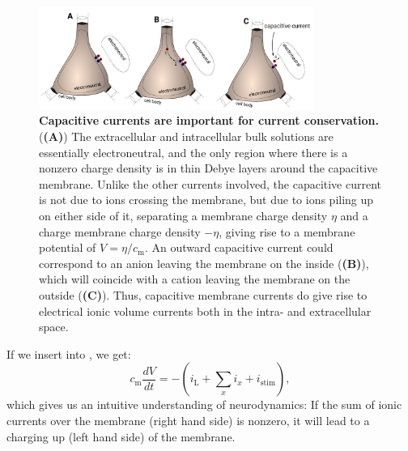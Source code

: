 \begin{figure}[!ht]
\begin{center}
\includegraphics[width=0.8\textwidth]{Figures/Neuron/capacitive_currents.pdf}
\end{center}
\caption{\textbf{Capacitive currents are important for current conservation.}  (\textbf{(A)}) The extracellular and intracellular bulk solutions are essentially electroneutral, and the only region where there is a nonzero charge density is in thin Debye layers around the capacitive membrane. Unlike the other currents involved, the capacitive current is not due to ions crossing the membrane, but due to ions piling up on either side of it, separating a membrane charge density $\eta$ and a charge membrane charge density $-\eta$, giving rise to a membrane potential of $V = \eta/c_{\mathrm{m}}$. An outward capacitive current could correspond to an anion leaving the membrane on the inside (\textbf{(B)}), which will coincide with a cation leaving the membrane on the outside (\textbf{(C)}). Thus, capacitive membrane currents do give rise to electrical ionic volume currents both in the intra- and extracellular space.
}
\label{fig:Neuron:capacitive_currents}
\end{figure}

If we insert  into , we get:
\begin{equation}
c_{\mathrm{m}} \frac{dV}{dt} = - (i_{\mathrm{L}} + \sum_x{i_x} +  i_{\mathrm{stim}}),
\label{eq:Neuron:singlecomp_capinserted}
\end{equation}
which gives us an intuitive understanding of neurodynamics: If the sum of ionic currents over the membrane (right hand side) is nonzero, it will lead to a charging up (left hand side) of the membrane. 


